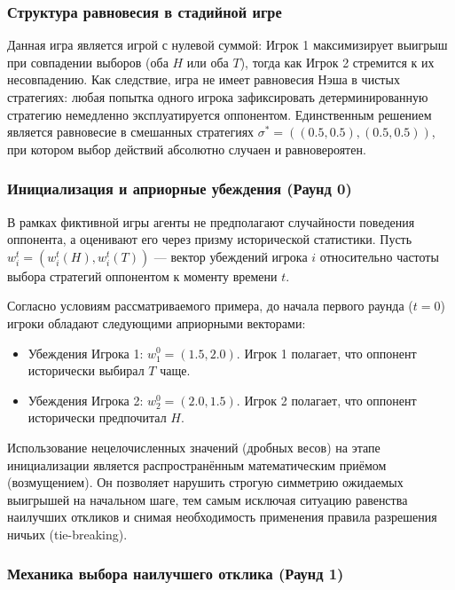 \subsubsection{Структура равновесия в стадийной игре}

Данная игра является игрой с нулевой суммой: Игрок 1 максимизирует выигрыш при совпадении выборов (оба $H$ или оба $T$), тогда как Игрок 2 стремится к их несовпадению. Как следствие, игра не имеет равновесия Нэша в чистых стратегиях: любая попытка одного игрока зафиксировать детерминированную стратегию немедленно эксплуатируется оппонентом. Единственным решением является равновесие в смешанных стратегиях $\sigma^* = ((0.5, 0.5), (0.5, 0.5))$, при котором выбор действий абсолютно случаен и равновероятен.

\subsubsection{Инициализация и априорные убеждения (Раунд 0)}

В рамках фиктивной игры агенты не предполагают случайности поведения оппонента, а оценивают его через призму исторической статистики. Пусть $w_i^t = (w_i^t(H), w_i^t(T))$ --- вектор убеждений игрока $i$ относительно частоты выбора стратегий оппонентом к моменту времени $t$. 

Согласно условиям рассматриваемого примера, до начала первого раунда ($t=0$) игроки обладают следующими априорными векторами:
\begin{itemize}
    \item Убеждения Игрока 1: $w_1^0 = (1.5, 2.0)$. Игрок 1 полагает, что оппонент исторически выбирал $T$ чаще.
    \item Убеждения Игрока 2: $w_2^0 = (2.0, 1.5)$. Игрок 2 полагает, что оппонент исторически предпочитал $H$.
\end{itemize}

Использование нецелочисленных значений (дробных весов) на этапе инициализации является распространённым математическим приёмом (возмущением). Он позволяет нарушить строгую симметрию ожидаемых выигрышей на начальном шаге, тем самым исключая ситуацию равенства наилучших откликов и снимая необходимость применения правила разрешения ничьих (tie-breaking).

\subsubsection{Механика выбора наилучшего отклика (Раунд 1)}

